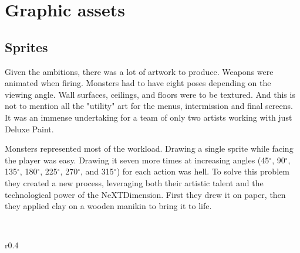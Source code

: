 \section{Graphic assets}
\subsection{Sprites}
Given the ambitions, there was a lot of artwork to produce. Weapons were animated when firing. Monsters had to have eight poses depending on the viewing angle. Wall surfaces, ceilings, and floors were to be textured. And this is not to mention all the "utility" art for the menus, intermission and final screens. It was an immense undertaking for a team of only two artists working with just Deluxe Paint.\\
\par
Monsters represented most of the workload. Drawing a single sprite while facing the player was easy. Drawing it seven more times at increasing angles (45$^{\circ}$, 90$^{\circ}$, 135$^{\circ}$, 180$^{\circ}$, 225$^{\circ}$, 270$^{\circ}$, and 315$^{\circ}$) for each action was hell. To solve this problem they created a new process, leveraging both their artistic talent and the technological power of the NeXTDimension. First they drew it on paper, then they applied clay on a wooden manikin to bring it to life.\\
\par


\\


\begin{wrapfigure}[8]{r}{0.4\textwidth}
\centering
{}
\end{wrapfigure}

